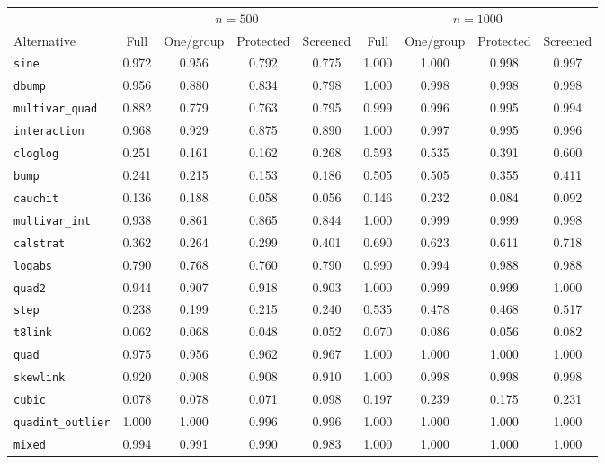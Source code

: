 \begin{tabular}{lcccccccc}
\toprule
 & \multicolumn{4}{c}{$n=500$} & \multicolumn{4}{c}{$n=1000$} \\
\cmidrule(lr){2-5}\cmidrule(lr){6-9}
Alternative & Full & One/group & Protected & Screened & Full & One/group & Protected & Screened \\
\midrule
\texttt{sine} & 0.972 & 0.956 & 0.792 & 0.775 & 1.000 & 1.000 & 0.998 & 0.997 \\
\texttt{dbump} & 0.956 & 0.880 & 0.834 & 0.798 & 1.000 & 0.998 & 0.998 & 0.998 \\
\texttt{multivar\_quad} & 0.882 & 0.779 & 0.763 & 0.795 & 0.999 & 0.996 & 0.995 & 0.994 \\
\texttt{interaction} & 0.968 & 0.929 & 0.875 & 0.890 & 1.000 & 0.997 & 0.995 & 0.996 \\
\texttt{cloglog} & 0.251 & 0.161 & 0.162 & 0.268 & 0.593 & 0.535 & 0.391 & 0.600 \\
\texttt{bump} & 0.241 & 0.215 & 0.153 & 0.186 & 0.505 & 0.505 & 0.355 & 0.411 \\
\texttt{cauchit} & 0.136 & 0.188 & 0.058 & 0.056 & 0.146 & 0.232 & 0.084 & 0.092 \\
\texttt{multivar\_int} & 0.938 & 0.861 & 0.865 & 0.844 & 1.000 & 0.999 & 0.999 & 0.998 \\
\texttt{calstrat} & 0.362 & 0.264 & 0.299 & 0.401 & 0.690 & 0.623 & 0.611 & 0.718 \\
\texttt{logabs} & 0.790 & 0.768 & 0.760 & 0.790 & 0.990 & 0.994 & 0.988 & 0.988 \\
\texttt{quad2} & 0.944 & 0.907 & 0.918 & 0.903 & 1.000 & 0.999 & 0.999 & 1.000 \\
\texttt{step} & 0.238 & 0.199 & 0.215 & 0.240 & 0.535 & 0.478 & 0.468 & 0.517 \\
\texttt{t8link} & 0.062 & 0.068 & 0.048 & 0.052 & 0.070 & 0.086 & 0.056 & 0.082 \\
\texttt{quad} & 0.975 & 0.956 & 0.962 & 0.967 & 1.000 & 1.000 & 1.000 & 1.000 \\
\texttt{skewlink} & 0.920 & 0.908 & 0.908 & 0.910 & 1.000 & 0.998 & 0.998 & 0.998 \\
\texttt{cubic} & 0.078 & 0.078 & 0.071 & 0.098 & 0.197 & 0.239 & 0.175 & 0.231 \\
\texttt{quadint\_outlier} & 1.000 & 1.000 & 0.996 & 0.996 & 1.000 & 1.000 & 1.000 & 1.000 \\
\texttt{mixed} & 0.994 & 0.991 & 0.990 & 0.983 & 1.000 & 1.000 & 1.000 & 1.000 \\

\end{tabular}
